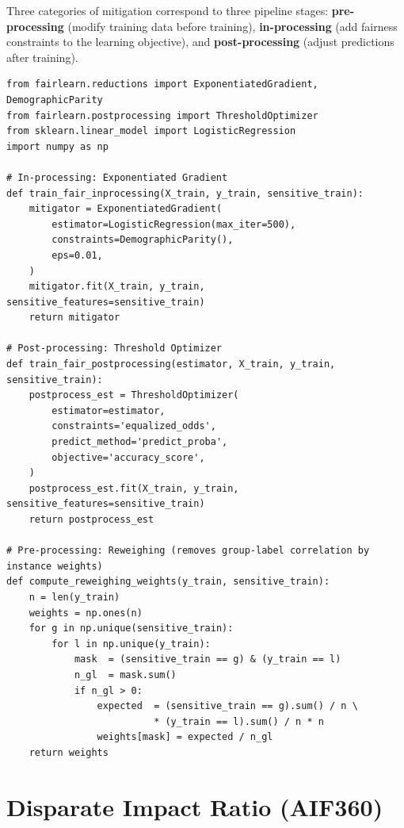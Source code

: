 Three categories of mitigation correspond to three pipeline stages: \textbf{pre-processing} (modify training data before training), \textbf{in-processing} (add fairness constraints to the learning objective), and \textbf{post-processing} (adjust predictions after training).

\begin{lstlisting}[style=python, caption={In-processing, post-processing, and pre-processing mitigation}]
from fairlearn.reductions import ExponentiatedGradient, DemographicParity
from fairlearn.postprocessing import ThresholdOptimizer
from sklearn.linear_model import LogisticRegression
import numpy as np

# In-processing: Exponentiated Gradient
def train_fair_inprocessing(X_train, y_train, sensitive_train):
    mitigator = ExponentiatedGradient(
        estimator=LogisticRegression(max_iter=500),
        constraints=DemographicParity(),
        eps=0.01,
    )
    mitigator.fit(X_train, y_train, sensitive_features=sensitive_train)
    return mitigator

# Post-processing: Threshold Optimizer
def train_fair_postprocessing(estimator, X_train, y_train, sensitive_train):
    postprocess_est = ThresholdOptimizer(
        estimator=estimator,
        constraints='equalized_odds',
        predict_method='predict_proba',
        objective='accuracy_score',
    )
    postprocess_est.fit(X_train, y_train, sensitive_features=sensitive_train)
    return postprocess_est

# Pre-processing: Reweighing (removes group-label correlation by instance weights)
def compute_reweighing_weights(y_train, sensitive_train):
    n = len(y_train)
    weights = np.ones(n)
    for g in np.unique(sensitive_train):
        for l in np.unique(y_train):
            mask  = (sensitive_train == g) & (y_train == l)
            n_gl  = mask.sum()
            if n_gl > 0:
                expected  = (sensitive_train == g).sum() / n \
                          * (y_train == l).sum() / n * n
                weights[mask] = expected / n_gl
    return weights
\end{lstlisting}

\section{Disparate Impact Ratio (AIF360)}
\label{sec:a14-dir}

